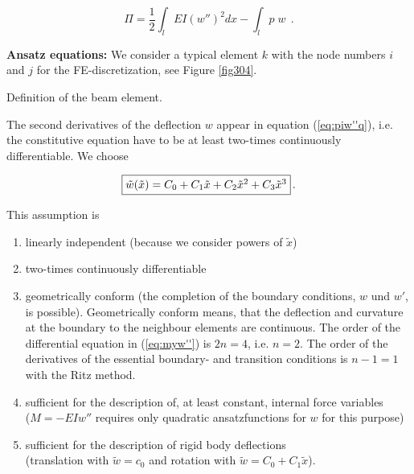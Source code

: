 \begin{equation}
\Pi = \frac{1}{2} \int_l EI (w'')^2 dx - \int_l p\; w \; \, .
\label{eq:piw''q}
\end{equation}

{\bf Ansatz equations:}
We consider a typical element $k$ with the node numbers 
$i$ and $j$ for the FE-discretization, 
see Figure \ref{fig304}.
 
\begin{Figure}[htb]
\begin{center}

\setlength{\baselineskip}{11pt}
\caption{Definition of the beam element.}
\label{fig304}
\end{center}
\end{Figure}%

The second derivatives of the deflection $w$ appear in 
equation (\ref{eq:piw''q}), i.e. the constitutive 
equation have to be at least two-times continuously 
differentiable. We choose

\begin{equation}
\fbox{$\tilde{w}(\tilde{x}) = C_0 + C_1 \tilde{x} + C_2 \tilde{x}^2 +
C_3 \tilde{x}^3 $}\, .
\label{eq:ansatz}
\end{equation}

This assumption is

\begin{enumerate}
\item linearly independent (because we consider powers of $\tilde{x}$)
\item two-times continuously differentiable
\item geometrically conform (the completion of the boundary conditions, $w$ und $w'$, is possible). Geometrically conform
means, that the deflection and curvature at the boundary to 
the neighbour elements are continuous. 
The order of the differential equation in (\ref{eq:myw''}) 
is $2 n = 4$, i.e. $n=2$. 
The order of the derivatives of the essential boundary- and 
transition conditions is  $n-1=1$ with the Ritz method. 
\item sufficient for the description of, at least constant, 
internal force variables \\($M = -EI w''$ requires only 
quadratic ansatzfunctions for $w$ for this purpose)
\item sufficient for the description of rigid body deflections \\
(translation with $\tilde{w}= c_0$ and rotation with $\tilde{w} = C_0 + C_1\tilde{x}$).
\end{enumerate}

